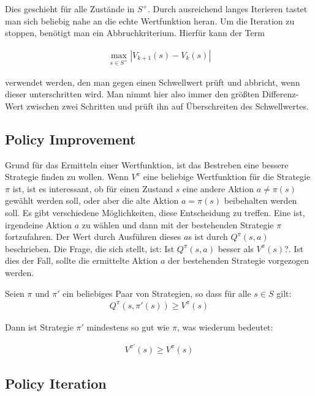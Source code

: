 \documentclass[10pt]{scrartcl}
\begin{document}
Dies geschieht für alle Zustände in $S^+$. Durch ausreichend langes Iterieren tastet man sich beliebig nahe an die echte Wertfunktion heran. Um die Iteration zu stoppen, benötigt man ein Abbruchkriterium. Hierfür kann der Term 

\begin{align*}
\max\limits_{s\in S^+} |V_{k+1}(s)-V_k(s)|
\end{align*}

verwendet werden, den man gegen einen Schwellwert prüft und abbricht, wenn dieser unterschritten wird. Man nimmt hier also immer den größten Differenz-Wert zwischen zwei Schritten und prüft ihn auf Überschreiten des Schwellwertes.


\subsection{Policy Improvement}
Grund für das Ermitteln einer Wertfunktion, ist das Bestreben eine bessere Strategie finden zu wollen. Wenn $V^\pi$ eine beliebige Wertfunktion für die  Strategie $\pi$ ist,  ist es interessant, ob für einen Zustand $s$ eine andere Aktion $a\neq\pi(s)$   gewählt werden soll, oder aber die alte Aktion $a=\pi(s)$ beibehalten werden soll.
Es gibt verschiedene Möglichkeiten, diese  Entscheidung zu treffen. Eine ist, irgendeine Aktion $a$ zu wählen und dann mit der bestehenden Strategie $\pi$ fortzufahren. Der Wert durch Ausführen dieses $a$s ist durch $Q^\pi(s,a)$ beschrieben. Die Frage, die sich stellt, ist: Ist $Q^\pi(s,a)$ besser als $V^\pi(s)$?.
Ist dies der Fall, sollte die ermittelte Aktion $a$ der bestehenden Strategie vorgezogen werden.

Seien $\pi$ und $\pi'$ ein beliebiges Paar von Strategien, so dass für alle $s \in S$ gilt:
\begin{align*}
Q^\pi(s,\pi'(s)) \ge V^\pi(s)
\end{align*}

Dann ist Strategie $\pi'$  mindestens so gut wie $\pi$, was wiederum bedeutet:

\begin{align*}
V^{\pi'}(s) \ge V^\pi(s)
\end{align*}

\subsection{Policy Iteration}
\end{document}

